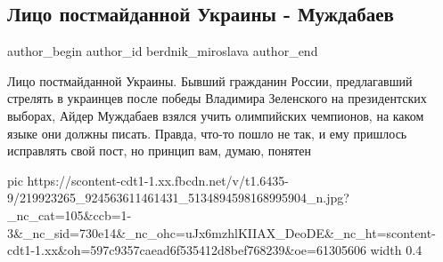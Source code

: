  
 
 
 
 
 
\subsection{Лицо постмайданной Украины - Муждабаев}
\label{sec:26_07_2021.fb.berdnik_miroslava.5.muzhdabajev_bilodid}
 
\ifcmt
 author_begin
   author_id berdnik_miroslava
 author_end
\fi

Лицо постмайданной Украины.   Бывший гражданин России, предлагавший стрелять в
украинцев после победы Владимира Зеленского на президентских выборах,  Айдер
Муждабаев взялся учить олимпийских чемпионов, на каком языке они должны писать.
Правда, что-то пошло не так, и ему пришлось исправлять свой пост, но принцип
вам, думаю, понятен

\ifcmt
  pic https://scontent-cdt1-1.xx.fbcdn.net/v/t1.6435-9/219923265_924563611461431_5134894598168995904_n.jpg?_nc_cat=105&ccb=1-3&_nc_sid=730e14&_nc_ohc=uJx6mzhlKIIAX_DeoDE&_nc_ht=scontent-cdt1-1.xx&oh=597c9357caead6f535412d8bef768239&oe=61305606
  width 0.4
\fi
